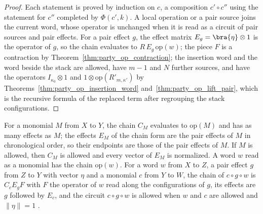 \begin{proof}\leanok
    Each statement is proved by induction on $c$, a composition $c'\circ c''$ using
    the statement for $c''$ completed by $\Phi(c',k)$. A local operation or a pair
    source joins the current word, whose operator is unchanged when it is read as a
    circuit of pair sources and pair effects. For a pair effect $g$, the effect
    matrix $E_g=\bra{\eta}\otimes1$ is the operator of $g$, so the chain evaluates
    to $R\,E_g\,\mathrm{op}(w)$; the piece $F$ is a contraction by
    Theorem~\ref{thm:party_op_contraction}; the insertion word and the word beside
    the stack are allowed, have $m-1$ and $N$ further sources, and have the
    operators $I_{\kappa_0}\otimes1$ and $1\otimes\mathrm{op}(R'_{m,\kappa'})$ by
    Theorems~\ref{thm:party_op_insertion_word} and~\ref{thm:party_op_lift_pair},
    which is the recursive formula of the replaced term after regrouping the stack
    configurations.
\end{proof}

\begin{theorem}
    \label{thm:party_monomial_chain}
    \leanok
    For a monomial $M$ from $X$ to $Y$, the chain $C_M$ evaluates to $\mathrm{op}(M)$
    and has as many effects as $M$; the effects $E_M$ of the chain form are the pair
    effects of $M$ in chronological order, so their endpoints are those of the pair
    effects of $M$. If $M$ is allowed, then $C_M$ is allowed and every vector of
    $E_M$ is normalized. A word $w$ read as a monomial has the chain
    $\mathrm{op}(w)$. For a word $w$ from $X$ to $Z$, a pair effect $g$ from $Z$ to
    $Y$ with vector $\eta$ and a monomial $c$ from $Y$ to $W$, the chain of
    $c\circ g\circ w$ is $C_cE_gF$ with $F$ the operator of $w$ read along the
    configurations of $g$, its effects are $g$ followed by $E_c$, and the circuit
    $c\circ g\circ w$ is allowed when $w$ and $c$ are allowed and
    $\lVert\eta\rVert=1$
    \cite[Lemma~5.1]{OpenAI2026PolynomialPEPS}.
\end{theorem}

